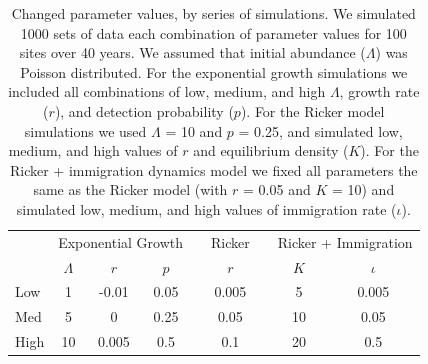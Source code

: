 \documentclass[12pt]{article}
\begin{document}
\begin{table}[t]
  \centering
  \caption{Changed parameter values, by series of simulations.  We
    simulated 1000 sets of data each combination of parameter values
    for 100 sites over 40 years.  We assumed that initial abundance
    ($\Lambda$) was Poisson distributed.  For the exponential growth
    simulations we included all combinations of low, medium, and high
    $\Lambda$, growth rate ($r$), and detection probability ($p$).  For the Ricker
    model simulations we used $\Lambda$ = 10 and $p$ = 0.25, and simulated low,
    medium, and high values of $r$ and equilibrium density ($K$).  For the
    Ricker + immigration dynamics model we fixed all parameters the
    same as the Ricker model (with $r$ = 0.05 and $K$ = 10) and simulated
    low, medium, and high values of immigration rate ($\iota$).}
  \begin{tabular}{lcccccccc}
    \hline
    & \multicolumn{3}{c}{Exponential Growth} && Ricker &&
    \multicolumn{2}{c}{Ricker + Immigration} \\
    \cline{2-4}     \cline{6-6}    \cline{8-9}
                & $\Lambda$ & $r$ & $p$ && $r$  && $K$ & $\iota$  \\
    \hline
    Low	        &1	&-0.01	&0.05	&&0.005	&&5	&0.005  \\
    Med	        &5	&0	&0.25	&&0.05	&&10	&0.05   \\
    High	&10	&0.005	&0.5	&&0.1	&&20	&0.5    \\
    \hline
  \end{tabular}
\end{table}

\vfill
\newpage
\end{document}

